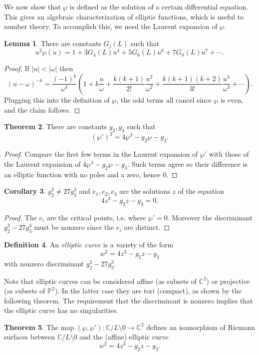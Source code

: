 \documentclass[12pt]{report}
\newcommand{\CC}{\mathbb{C}}
\newcommand{\PP}{\mathbb{P}}
\newcommand{\dfn}[1]{\emph{#1}\index{#1}}
\theoremstyle{definition}
\newtheorem{theorem}{Theorem}[chapter]
\newtheorem{lemma}[theorem]{Lemma}
\newtheorem{corollary}[theorem]{Corollary}
\newtheorem{definition}[theorem]{Definition}
\begin{document}
We now show that $\wp$ is defined as the solution of a certain differential equation.
This gives an algebraic characterization of elliptic functions, which is useful to number theory.
To accomplish this, we need the Laurent expansion of $\wp$.
\begin{lemma}
There are constants $G_j(L)$ such that
$$u^2\wp(u) = 1 + 3G_4(L)u^4 + 5G_6(L)u^6 + 7G_8(L)u^7 + \cdots.$$
\end{lemma}
\begin{proof}
If $|u| < |\omega|$ then
$$(u - \omega)^{-k} = \frac{(-1)^k}{\omega^k}\left(1 + k\frac{u}{\omega} + \frac{k(k+1)}{2!} \frac{u^2}{\omega^2} + \frac{k(k+1)(k+2)}{3!}\frac{u^3}{\omega^3} + \cdots\right).$$
Plugging this into the definition of $\wp$, the odd terms all cancel since $\wp$ is even, and the claim follows.
\end{proof}
\begin{theorem}
There are constants $g_2,g_3$ such that
$$(\wp')^2 = 4\wp^3 - g_2\wp - g_3.$$
\end{theorem}
\begin{proof}
Compare the first few terms in the Laurent expansion of $\wp'$ with those of the Laurent expansion of $4\wp^3 - g_2\wp - g_3$.
Such terms agree so their difference is an elliptic function with no poles and a zero, hence $0$.
\end{proof}
\begin{corollary}
$g_2^3 \neq 27g_3^3$ and $e_1,e_2,e_3$ are the solutions $z$ of the equation
$$4z^3 - g_2z - g_3 = 0.$$
\end{corollary}
\begin{proof}
The $e_i$ are the critical points, i.e. where $\wp' = 0$. Moreover the discriminant $g_2^3 - 27g_3^3$ must be nonzero since the $e_i$ are distinct.
\end{proof}
\begin{definition}
An \dfn{elliptic curve} is a variety of the form
$$w^2 = 4z^3 - g_2z - g_3$$
with nonzero discriminant $g_2^3 - 27g_3^3$.
\end{definition}
Note that elliptic curves can be considered affine (as subsets of $\CC^2$) or projective (as subsets of $\PP^2$). In the latter case they are tori (compact), as shown by the following theorem.
The requirement that the discriminant is nonzero implies that the elliptic curve has no singularities.
\begin{theorem}
The map $(\wp, \wp'): \CC/L \setminus 0 \to \CC^2$ defines an isomorphism of Riemann surfaces between $\CC/L \setminus 0$ and the (affine) elliptic curve
$$w^2 = 4z^3 - g_2z - g_3.$$
\end{theorem}
\end{document}
